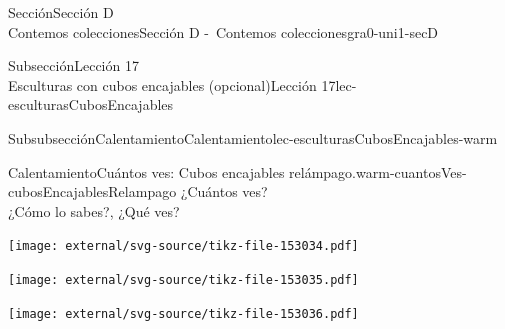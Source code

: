 \begin{sectionptx}{Sección}{{\Large Sección D\\}Contemos colecciones}{}{Sección D -~Contemos colecciones}{}{}{gra0-uni1-secD}
\begin{subsectionptx}{Subsección}{{\normalsize Lección 17\\[-0.05cm]}Esculturas con cubos encajables (opcional)}{}{Lección 17}{}{}{lec-esculturasCubosEncajables}
%
%
\typeout{************************************************}
\typeout{************************************************}
%
\begin{subsubsectionptx}{Subsubsección}{Calentamiento}{}{Calentamiento}{}{}{lec-esculturasCubosEncajables-warm}
\begin{exploration}{Calentamiento}{Cuántos ves: Cubos encajables relámpago.}{warm-cuantosVes-cubosEncajablesRelampago}%
¿Cuántos ves?\\
 ¿Cómo lo sabes?, ¿Qué ves?%
\par
\texttt{[image: external/svg-source/tikz-file-153034.pdf]}
\par
\texttt{[image: external/svg-source/tikz-file-153035.pdf]}
\par
\texttt{[image: external/svg-source/tikz-file-153036.pdf]}
\end{exploration}%
\end{subsubsectionptx}
%
%
\typeout{************************************************}
\typeout{************************************************}
%
%
%
\typeout{************************************************}
\typeout{************************************************}
%

\end{subsectionptx}
\end{sectionptx}
